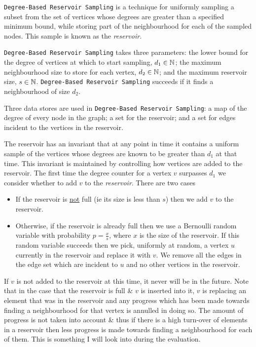 \documentclass[11pt,twoside,a4paper]{report}
\begin{document}
\texttt{Degree-Based Reservoir Sampling} is a technique for uniformly sampling a subset from the set of vertices whose degrees are greater than a specified minimum bound, while storing part of the neighbourhood for each of the sampled nodes. This sample is known as the \textit{reservoir}.

\par \texttt{Degree-Based Reservoir Sampling} takes three parameters: the lower bound for the degree of vertices at which to start sampling, $d_1\in\mathbb{N}$; the maximum neighbourhood size to store for each vertex, $d_2\in\mathbb{N}$; and the maximum reservoir size, $s\in\mathbb{N}$. \texttt{Degree-Based Reservoir Sampling} succeeds if it finds a neighbourhood of size $d_2$.


\par Three data stores are used in \texttt{Degree-Based Reservoir Sampling}: a map of the degree of every node in the graph; a set for the reservoir; and a set for edges incident to the vertices in the reservoir.

\par The reservoir has an invariant that at any point in time it contains a uniform sample of the vertices whose degrees are known to be greater than $d_1$ at that time. This invariant is maintained by controlling how vertices are added to the reservoir. The first time the degree counter for a vertex $v$ surpasses $d_1$ we consider whether to add $v$ to the \textit{reservoir}. There are two cases
\begin{itemize}
	\item If the reservoir is \underline{not} full (ie its size is less than $s$) then we add $v$ to the reservoir.
	\item Otherwise, if the reservoir is already full then we use a Bernoulli random variable with probability $p=\frac{x}s$, where $x$ is the size of the reservoir. If this random variable succeeds then we pick, uniformly at random, a vertex $u$ currently in the reservoir and replace it with $v$. We remove all the edges in the edge set which are incident to $u$ and no other vertices in the reservoir.
\end{itemize}
If $v$ is not added to the reservoir at this time, it never will be in the future. Note that in the case that the reservoir is full \& $v$ is inserted into it, $v$ is replacing an element that was in the reservoir and any progress which has been made towards finding a neighbourhood for that vertex is annulled in doing so. The amount of progress is not taken into account \& thus if there is a high turn-over of elements in a reservoir then less progress is made towards finding a neighbourhood for each of them. This is something I will look into during the evaluation.
\end{document}
